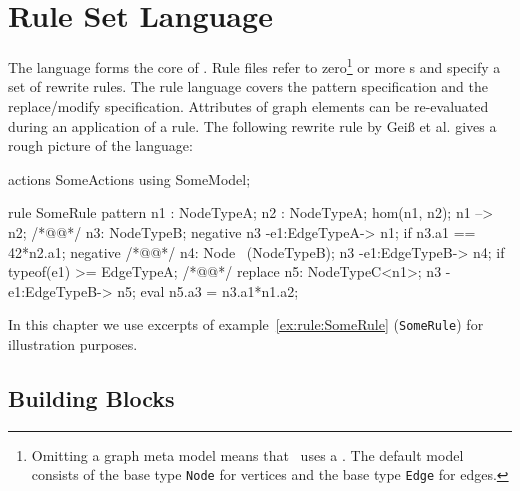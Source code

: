 \chapter{Rule Set Language}
\label{chaprulelang}

The  language forms the core of \GrG. Rule files refer to zero\footnote{Omitting a graph meta model means that \GrG\ uses a . The default model consists of the base type \texttt{Node} for vertices and the base type \texttt{Edge} for edges.} or more s and specify a set of rewrite rules. The rule language covers the pattern specification and the replace/modify specification. Attributes of graph elements can be re-evaluated during an application of a rule. The following rewrite rule by Geiß et al. \cite{GBGHS:06} gives a rough picture of the language:
\begin{example}\label{ex:rule:SomeRule}
\begin{grgen}
actions SomeActions using SomeModel;

rule SomeRule {
  pattern {
    n1 : NodeTypeA;
    n2 : NodeTypeA;
    hom(n1, n2);
    n1 --> n2; /*@\label{ex:somerule:graphlet}@*/
    n3: NodeTypeB;
    negative {
      n3 -e1:EdgeTypeA-> n1;
      if {n3.a1 == 42*n2.a1;}
    }
    negative { /*@\label{ex:somerule:secondnac:begin}@*/
      n4: Node \ (NodeTypeB);
      n3 -e1:EdgeTypeB-> n4;
      if {typeof(e1) >= EdgeTypeA;}
    } /*@\label{ex:somerule:secondnac:end}@*/
  }
  replace {
    n5: NodeTypeC<n1>;
    n3 -e1:EdgeTypeB-> n5;
    eval {
      n5.a3 = n3.a1*n1.a2;
    }
  }  
}
\end{grgen}
\end{example}
In this chapter we use excerpts of example~\ref{ex:rule:SomeRule} (\texttt{SomeRule}) for illustration purposes.

\section{Building Blocks}
\label{rulebb}

